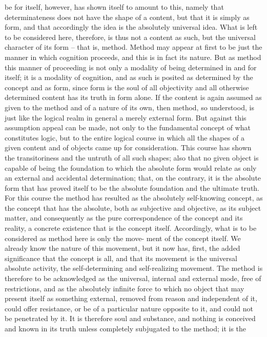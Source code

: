 be for itself, however, has shown itself to amount to this, namely that
determinateness does not have the shape of a content, but that it is simply
as form, and that accordingly the idea is the absolutely universal idea. What
is left to be considered here, therefore, is thus not a content as such, but
the universal character of its form – that is, method.
Method may appear at first to be just the manner in which cognition
proceeds, and this is in fact its nature. But as method this manner of
proceeding is not only a modality of being determined in and for itself; it is a
modality of cognition, and as such is posited as determined by the concept
and as form, since form is the soul of all objectivity and all otherwise
determined content has its truth in form alone. If the content is again
assumed as given to the method and of a nature of its own, then method,
so understood, is just like the logical realm in general a merely external
form. But against this assumption appeal can be made, not only to the
fundamental concept of what constitutes logic, but to the entire logical
course in which all the shapes of a given content and of objects came up for
consideration. This course has shown the transitoriness and the untruth of
all such shapes; also that no given object is capable of being the foundation
to which the absolute form would relate as only an external and accidental
determination; that, on the contrary, it is the absolute form that has proved
itself to be the absolute foundation and the ultimate truth. For this course
the method has resulted as the absolutely self-knowing concept, as the concept
that has the absolute, both as subjective and objective, as its subject matter,
and consequently as the pure correspondence of the concept and its reality,
a concrete existence that is the concept itself.
Accordingly, what is to be considered as method here is only the move-
ment of the concept itself. We already know the nature of this movement,
but it now has, first, the added significance that the concept is all, and
that its movement is the universal absolute activity, the self-determining
and self-realizing movement. The method is therefore to be acknowledged
as the universal, internal and external mode, free of restrictions, and as
the absolutely infinite force to which no object that may present itself as
something external, removed from reason and independent of it, could
offer resistance, or be of a particular nature opposite to it, and could not be
penetrated by it. It is therefore soul and substance, and nothing is conceived
and known in its truth unless completely subjugated to the method; it is the
